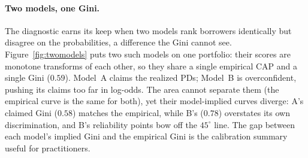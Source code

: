 \documentclass[12pt]{article}
\begin{document}
\paragraph{Two models, one Gini.} The diagnostic earns its keep when two models rank borrowers
identically but disagree on the probabilities, a difference the Gini cannot see.
Figure~\ref{fig:twomodels} puts two such models on one portfolio: their scores are monotone
transforms of each other, so they share a single empirical CAP and a single Gini ($0.59$).
Model~A claims the realized PDs; Model~B is overconfident, pushing its claims too far in
log-odds. The area cannot separate them (the empirical curve is the same for both), yet
their model-implied curves diverge: A's claimed Gini ($0.58$) matches the empirical, while B's
($0.78$) overstates its own discrimination, and B's reliability points bow off the $45^\circ$
line. The gap between each model's implied Gini and the empirical Gini is the calibration
summary useful for practitioners.
\end{document}
